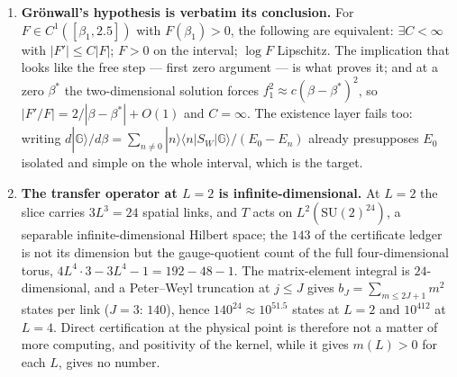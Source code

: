\begin{enumerate}[label=(\roman*)]
  if in some phase convention $\mathbb G_\beta\ge\mathbb G_{\beta'}$ pointwise, equal norms force
  $\mathbb G_\beta=\mathbb G_{\beta'}$, two different kernels would share an eigenvector, and
  $\Phi\equiv\mathrm{const}$, a contradiction; and the overall phase is a convention under which the
  assertion flips.
  (b) \emph{The connected operator is sign-indefinite at every $\beta$}: because
  $\langle 1|\mathbb G_\beta\rangle=0$, the functional $F=\langle1|O|\mathbb G_\beta\rangle$ is
  invariant under $O\mapsto O-c$ for every constant $c$; choosing $c=\langle O\rangle$ --- the
  subtraction physics requires --- makes the numerical range straddle zero. Positivity of $O$ as a
  plaquette operator is therefore unusable, and it is not a question of a missing inequality.
\item \textbf{Gr\"onwall's hypothesis is verbatim its conclusion.} \LT{} For $F\in C^1([\beta_1,2.5])$
  with $F(\beta_1)>0$, the following are equivalent: $\exists C<\infty$ with $|F'|\le C|F|$;
  $F>0$ on the interval; $\log F$ Lipschitz. The implication that looks like the free step --- first
  zero argument --- is what proves it; and at a zero $\beta^*$ the two-dimensional solution forces
  $f_1^2\approx c(\beta-\beta^*)^2$, so $|F'/F|=2/|\beta-\beta^*|+O(1)$ and $C=\infty$. The existence
  layer fails too: writing $d|\mathbb G\rangle/d\beta=\sum_{n\neq0}|n\rangle\langle n|S_W|\mathbb G\rangle/(E_0-E_n)$
  already presupposes $E_0$ isolated and simple on the whole interval, which is the target.
\item \textbf{The transfer operator at $L=2$ is infinite-dimensional.} \LT{} At $L=2$ the slice
  carries $3L^3=24$ spatial links, and $T$ acts on $L^2(\mathrm{SU}(2)^{24})$, a separable
  infinite-dimensional Hilbert space; the $143$ of the certificate ledger is not its dimension but the
  gauge-quotient count of the full four-dimensional torus, $4L^4\cdot3-3L^4-1=192-48-1$. The
  matrix-element integral is $24$-dimensional, and a Peter--Weyl truncation at $j\le J$ gives
  $b_J=\sum_{m\le 2J+1}m^2$ states per link ($J=3$: $140$), hence $140^{24}\approx10^{51.5}$ states at
  $L=2$ and $10^{412}$ at $L=4$. Direct certification at the physical point is therefore not a matter
  of more computing, and positivity of the kernel, while it gives $m(L)>0$ for each $L$, gives no
  number.
\end{enumerate}

